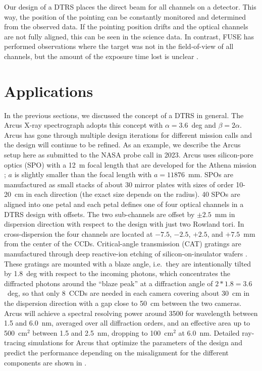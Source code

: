 \documentclass[linenumbers]{aastex631}
\begin{document}
Our design of a DTRS places the direct beam for all channels on a detector. This way, the position of the pointing can be constantly monitored and determined from the observed data. If the pointing position drifts and the optical channels are not fully aligned, this can be seen in the science data. In contrast, FUSE has performed observations where the target was not in the field-of-view of all channels, but the amount of the exposure time lost is unclear \citep{2000ApJ...538L...1M}.

\section{Applications}
\label{sect:applications}
In the previous sections, we discussed the concept of a DTRS in general. The Arcus X-ray spectrograph \citep{2023SPIE12678E..0ES} adopts this concept with $\alpha=3.6$~deg and $\beta=2\alpha$. Arcus has gone through multiple design iterations for different mission calls and the design will continue to be refined. As an example, we describe the Arcus setup here as submitted to the NASA probe call in 2023. Arcus uses silicon-pore optics (SPO) with a 12~m focal length that are developed for the Athena mission \citep{2023SPIE12679E..05G}; $a$ is slightly smaller than the focal length with $a=11876$~mm. SPOs are manufactured as small stacks of about 30 mirror plates with sizes of order 10-20~cm in each direction (the exact size depends on the radius). 40 SPOs are aligned into one petal and each petal defines one of four optical channels in a DTRS design with offsets. The two sub-channels are offset by $\pm2.5$~mm in dispersion direction with respect to the design with just two Rowland tori. In cross-dispersion the four channels are located at $-7.5$, $-2.5$, $+2.5$, and $+7.5$~mm from the center of the CCDs.
Critical-angle transmission (CAT) gratings are manufactured through deep reactive-ion etching of silicon-on-insulator wafers \citep{2021SPIE11822E..15H,2023SPIE12679E..0LH}. These gratings are mounted with a blaze angle, i.e.\ they are intentionally tilted by 1.8~deg with respect to the incoming photons, which concentrates the diffracted photons around the ``blaze peak'' at a diffraction angle of $2 * 1.8 = 3.6$~deg, so that only 8~CCDs are needed in each camera covering about 30~cm in the dispersion direction with a gap close to 50~cm between the two cameras. Arcus will achieve a spectral resolving power around 3500 for wavelength between 1.5 and 6.0~nm, averaged over all diffraction orders, and an effective area up to 500~cm$^2$ between 1.5 and 2.5~nm, dropping to 100~cm$^2$ at 6.0~nm. Detailed ray-tracing simulations for Arcus that optimize the parameters of the design and predict the performance depending on the misalignment for the different components are shown in \citet{2017SPIE10397E..0PG,2018SPIE10699E..6FG,2023SPIE12678E..1DG}.
\end{document}
